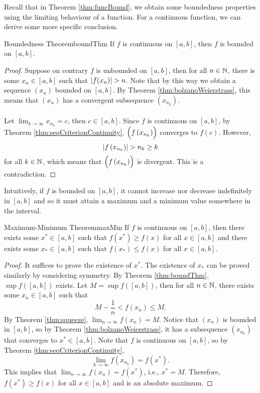 \documentclass[math]{amznotes}
\theoremstyle{remark}
\begin{document}
Recall that in Theorem \ref{thm:funcBound}, we obtain some boundedness properties using the limiting behaviour of a function. For a continuous function, we can derive some more specific conclusion.
\begin{thmbox}{Boundedness Theorem}{boundThm}
    If $f$ is continuous on $[a, b]$, then $f$ is bounded on $[a, b]$.
    \tcblower
    \begin{proof}
        Suppose on contrary $f$ is unbounded on $[a, b]$, then for all $n \in \mathbb{N}$, there is some $x_n \in [a, b]$ such that ${\left\lvert {f(x_n)} \right\rvert} > n$. Note that by this way we obtain a sequence $(x_n)$ bounded on $[a, b]$. By Theorem \ref{thm:bolzanoWeierstrass}, this means that $(x_n)$ has a convergent subsequence $\left(x_{n_k}\right)$.
        \\\\
        Let $\lim_{k \to \infty}x_{n_k} = c$, then $c \in [a, b]$. Since $f$ is continuous on $[a, b]$, by Theorem \ref{thm:seqCriterionContinuity}, $\Bigl(f\left(x_{n_k}\right)\Bigr)$ converges to $f(c)$. However,
        \begin{equation*}
            {\left\lvert {f\left(x_{n_k}\right)} \right\rvert} > n_k \geq k
        \end{equation*}
        for all $k \in \mathbb{N}$, which means that $\Bigl(f\left(x_{n_k}\right)\Bigr)$ is divergent. This is a contradiction.
    \end{proof}
\end{thmbox}
Intuitively, if $f$ is bounded on $[a, b]$, it cannot increase nor decrease indefinitely in $[a, b]$ and so it must attain a maximum and a minimum value somewhere in the interval.
\begin{thmbox}{Maximum-Minimum Theorem}{maxMin}
    If $f$ is continuous on $[a, b]$, then there exists some $x^* \in [a, b]$ such that $f(x^*) \geq f(x)$ for all $x \in [a, b]$ and there exists some $x_* \in [a, b]$ such that $f(x_*) \leq f(x)$ for all $x \in [a, b]$.
    \tcblower
    \begin{proof}
        It suffices to prove the existence of $x^*$. The existence of $x_*$ can be proved similarly by considering symmetry. By Theorem \ref{thm:boundThm}, $\sup f([a, b])$ exists. Let $M = \sup f([a, b])$, then for all $n \in \mathbb{N}$, there exists some $x_n \in [a, b]$ such that
        \begin{equation*}
            M - \frac{1}{n} < f(x_n) \leq M.
        \end{equation*}
        By Theorem \ref{thm:squeeze}, $\lim_{n \to \infty}f(x_n) = M$. Notice that $(x_n)$ is bounded in $[a, b]$, so by Theorem \ref{thm:bolzanoWeierstrass}, it has a subsequence $\left(x_{n_k}\right)$ that converges to $x^* \in [a, b]$. Note that $f$ is continuous on $[a, b]$, so by Theorem \ref{thm:seqCriterionContinuity},
        \begin{equation*}
            \lim_{k \to \infty}f\left(x_{n_k}\right) = f(x^*).
        \end{equation*}
        This implies that $\lim_{n \to \infty}f(x_n) = f(x^*)$, i.e., $x^* = M$. Therefore, $f(x^*) \geq f(x)$ for all $x \in [a, b]$ and is an absolute maximum.
    \end{proof}
\end{thmbox}
\end{document}
